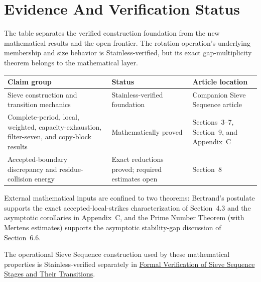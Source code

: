 \section{Evidence And Verification Status}
\label{sec:appendix-a-evidence-status}

The table separates the verified construction foundation from the new
mathematical results and the open frontier. The rotation operation's
underlying membership and size behavior is Stainless-verified, but its exact
gap-multiplicity theorem belongs to the mathematical layer.

\begin{center}
\begin{tabular}{>{\raggedright\arraybackslash}p{}>{\raggedright\arraybackslash}p{}>{\raggedright\arraybackslash}p{}}
\hline
\textbf{Claim group} & \textbf{Status} & \textbf{Article location}\\
\hline
Sieve construction and transition mechanics & Stainless-verified foundation & Companion Sieve Sequence article\\
Complete-period, local, weighted, capacity-exhaustion, filter-seven, and copy-block results & Mathematically proved & Sections~3--7, Section~9, and Appendix~C\\
Accepted-boundary discrepancy and residue-collision energy & Exact reductions proved; required estimates open & Section~8\\
\hline
\end{tabular}
\end{center}

External mathematical inputs are confined to two theorems: Bertrand's
postulate supports the exact accepted-local-strikes characterization of
Section~4.3 and the asymptotic corollaries
in Appendix~C, and the Prime Number Theorem (with Mertens estimates) supports
the asymptotic stability-gap discussion of
Section~6.6.

The operational Sieve Sequence construction used by these mathematical
properties is Stainless-verified separately in
\href{https://doi.org/10.5281/zenodo.22955782}{Formal Verification of Sieve
Sequence Stages and Their Transitions}. 
